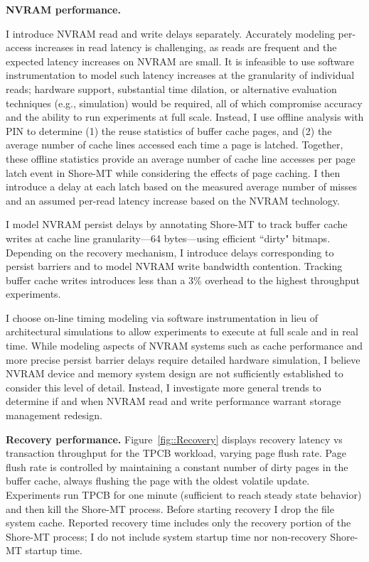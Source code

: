 \textbf{NVRAM performance.}

I introduce NVRAM read and write delays separately.
Accurately modeling per-access increases in read latency is challenging, as reads are frequent and the expected latency increases on NVRAM are small.
It is infeasible to use software instrumentation to model such latency increases at the granularity of individual reads; hardware support, substantial time dilation, or alternative evaluation techniques (e.g., simulation) would be required, all of which compromise accuracy and the ability to run experiments at full scale.
Instead, I use offline analysis with PIN \cite{LukCohn05} to determine (1) the reuse statistics of buffer cache pages, and (2) the average number of cache lines accessed each time a page is latched.
Together, these offline statistics provide an average number of cache line accesses per page latch event in Shore-MT while considering the effects of page caching.
I then introduce a delay at each latch based on the measured average number of misses and an assumed per-read latency increase based on the NVRAM technology.

I model NVRAM persist delays by annotating Shore-MT to track buffer cache writes at cache line granularity---64 bytes---using efficient ``dirty" bitmaps.
Depending on the recovery mechanism, I introduce delays corresponding to persist barriers and to model NVRAM write bandwidth contention.
Tracking buffer cache writes introduces less than a 3\% overhead to the highest throughput experiments.

I choose on-line timing modeling via software instrumentation in lieu of architectural simulations to allow experiments to execute at full scale and in real time.
While modeling aspects of NVRAM systems such as cache performance and more precise persist barrier delays require detailed hardware simulation, I believe NVRAM device and memory system design are not sufficiently established to consider this level of detail.
Instead, I investigate more general trends to determine if and when NVRAM read and write performance warrant storage management redesign.

\textbf{Recovery performance.} Figure~\ref{fig::Recovery} displays recovery latency vs transaction throughput for the TPCB workload, varying page flush rate.
Page flush rate is controlled by maintaining a constant number of dirty pages in the buffer cache, always flushing the page with the oldest volatile update.
Experiments run TPCB for one minute (sufficient to reach steady state behavior) and then kill the Shore-MT process.
Before starting recovery I drop the file system cache.
Reported recovery time includes only the recovery portion of the Shore-MT process; I do not include system startup time nor non-recovery Shore-MT startup time.

